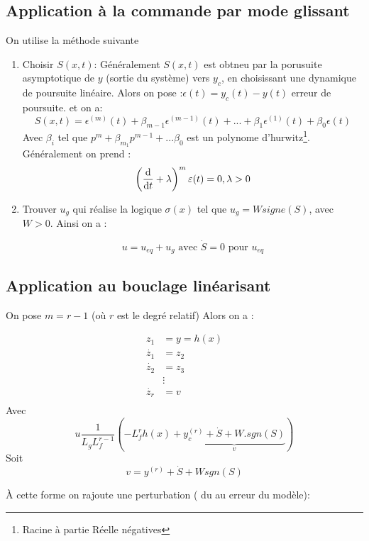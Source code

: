 \documentclass[main.tex]{subfiles}
\begin{document}
\subsection{Application à la commande par mode glissant}

On utilise la méthode suivante
\begin{enumerate}
\item Choisir $S(x,t)$:
  Généralement $S(x,t)$ est obtneu par la porusuite asymptotique de $y$ (sortie du système) vers $y_c$, en choisissant une dynamique de poursuite linéaire. Alors on pose :$\epsilon(t)= y_c(t) -y(t)$ erreur de poursuite. et on a:
  \[
    S(x,t) = \epsilon^{(m)}(t)+\beta_{m-1}\epsilon^{(m-1)}(t)+ ... +\beta_1 \epsilon^{(1)}(t)+\beta_0 \epsilon(t)
  \]
  Avec $\beta_i$ tel que $p^m+\beta_{m_1}p^{m-1}+ ... \beta_0$ est un polynome d'hurwitz\footnote{Racine à partie Réelle négatives}.
  Généralement on prend :
  \[
    \left(
      \deriv[]{t}+\lambda
    \right)^m \epsilon(t)= 0 ,\lambda > 0
  \]
\item Trouver $u_g$ qui réalise la logique $\sigma(x)$ tel que $u_g = W signe(S)$, avec  $W> 0$. Ainsi on a :

  \[
    u = u_{eq}+u_g \text{ avec } \dot{S} = 0 \text{ pour } u_{eq}
  \]
\end{enumerate}

\subsection{Application au bouclage linéarisant}
On pose $m= r-1$ (où $r$ est le degré relatif) Alors on a :

\begin{align*}
  z_1 &= y = h(x) \\
  \dot{z_1} &= z_2 \\
 \dot{z_2} &= z_3 \\
           & \vdots \\
 \dot{z_r} &= v \\
\end{align*}
Avec
\[
  u  \frac{1}{L_gL_f^{r-1}}\left(
-L_f^r h(x)+\underbrace{y_c^{(r)}+\dot{S}+W.sgn(S)}_{v}
\right)
\]
Soit
\[
  v = y^{(r)}+\dot{S} + W sgn(S)
\]

À cette forme on rajoute une perturbation ( du au erreur du modèle):
\end{document}

